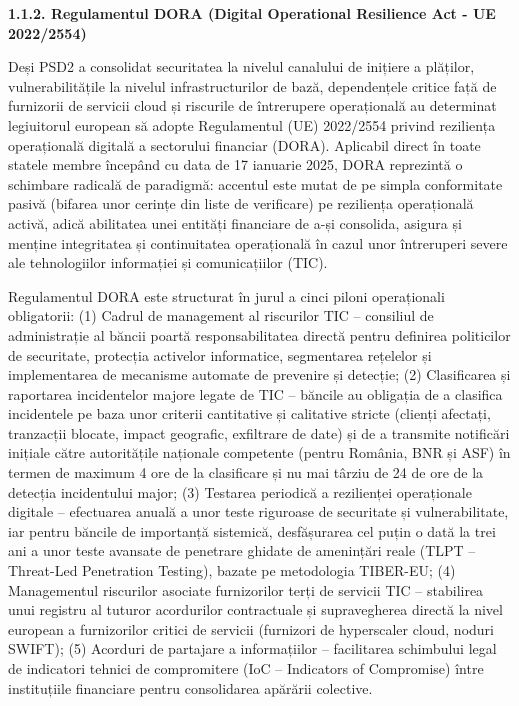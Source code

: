 \documentclass[
]{article}
\begin{document}
\textbf{1.1.2. Regulamentul DORA (Digital Operational Resilience Act -
UE 2022/2554)}

Deși PSD2 a consolidat securitatea la nivelul canalului de inițiere a
plăților, vulnerabilitățile la nivelul infrastructurilor de bază,
dependențele critice față de furnizorii de servicii cloud și riscurile
de întrerupere operațională au determinat legiuitorul european să adopte
Regulamentul (UE) 2022/2554 privind reziliența operațională digitală a
sectorului financiar (DORA). Aplicabil direct în toate statele membre
începând cu data de 17 ianuarie 2025, DORA reprezintă o schimbare
radicală de paradigmă: accentul este mutat de pe simpla conformitate
pasivă (bifarea unor cerințe din liste de verificare) pe reziliența
operațională activă, adică abilitatea unei entități financiare de a-și
consolida, asigura și menține integritatea și continuitatea operațională
în cazul unor întreruperi severe ale tehnologiilor informației și
comunicațiilor (TIC).

Regulamentul DORA este structurat în jurul a cinci piloni operaționali
obligatorii: (1) Cadrul de management al riscurilor TIC -- consiliul de
administrație al băncii poartă responsabilitatea directă pentru
definirea politicilor de securitate, protecția activelor informatice,
segmentarea rețelelor și implementarea de mecanisme automate de
prevenire și detecție; (2) Clasificarea și raportarea incidentelor
majore legate de TIC -- băncile au obligația de a clasifica incidentele
pe baza unor criterii cantitative și calitative stricte (clienți
afectați, tranzacții blocate, impact geografic, exfiltrare de date) și
de a transmite notificări inițiale către autoritățile naționale
competente (pentru România, BNR și ASF) în termen de maximum 4 ore de la
clasificare și nu mai târziu de 24 de ore de la detecția incidentului
major; (3) Testarea periodică a rezilienței operaționale digitale --
efectuarea anuală a unor teste riguroase de securitate și
vulnerabilitate, iar pentru băncile de importanță sistemică,
desfășurarea cel puțin o dată la trei ani a unor teste avansate de
penetrare ghidate de amenințări reale (TLPT -- Threat-Led Penetration
Testing), bazate pe metodologia TIBER-EU; (4) Managementul riscurilor
asociate furnizorilor terți de servicii TIC -- stabilirea unui registru
al tuturor acordurilor contractuale și supravegherea directă la nivel
european a furnizorilor critici de servicii (furnizori de hyperscaler
cloud, noduri SWIFT); (5) Acorduri de partajare a informațiilor --
facilitarea schimbului legal de indicatori tehnici de compromitere (IoC
-- Indicators of Compromise) între instituțiile financiare pentru
consolidarea apărării colective.
\end{document}
